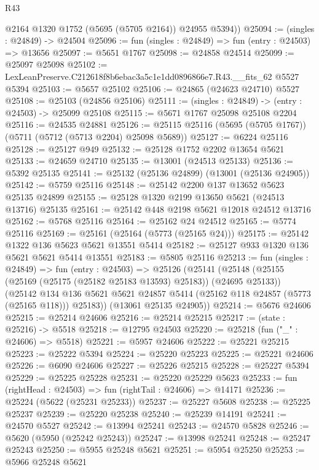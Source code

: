 \begin{lexlean}{R43}
\begin{coremodule}
        @2164
        @1320
        @1752
        (@5695 (@5705 @2164))
        @24955
        @5394))
@25094 := (singles : @24849) -> @24504
@25096 := fun (singles : @24849) => fun (entry : @24503) => @13656
@25097 := @5651 @1767
@25098 := @24858 @24514
@25099 := @25097 @25098
@25102 := LexLeanPreserve.C212618f8b6ebac3a5c1e1dd0896866e7.R43.__fits_62 @5527 @5394
@25103 := @5657 @25102
@25106 := @24865 (@24623 @24710) @5527
@25108 := @25103 (@24856 @25106)
@25111 := (singles : @24849) -> (entry : @24503) -> @25099 @25108
@25115 := @5671 @1767 @25098 @25108 @2204
@25116 := @24535 @24881
@25126 := @25115 @25116 (@5695 (@5705 @1767)) (@5711 (@5712 (@5713 @2204) @25098 @5689))
@25127 := @6224 @25116
@25128 := @25127 @949
@25132 := @25128 @1752 @2202 @13654 @5621
@25133 := @24659 @24710
@25135 := @13001 (@24513 @25133)
@25136 := @5392 @25135
@25141 := @25132 (@25136 @24899) (@13001 (@25136 @24905))
@25142 := @5759 @25116
@25148 := @25142 @2200 @137 @13652 @5623 @25135 @24899
@25155 := @25128 @1320 @2199 @13650 @5621 (@24513 @13716) @25135
@25161 := @25142 @448 @2198 @5621 @12018 @24512 @13716
@25162 := @5768 @25116
@25164 := @25162 @24 @24512
@25165 := @5774 @25116
@25169 := @25161 (@25164 (@5773 (@25165 @24)))
@25175 := @25142 @1322 @136 @5623 @5621 @13551 @5414
@25182 := @25127 @933 @1320 @136 @5621 @5621 @5414 @13551
@25183 := @5805 @25116
@25213 := fun (singles : @24849) =>
  fun (entry : @24503) =>
  @25126
    (@25141
      (@25148
        (@25155 (@25169 (@25175 (@25182 @25183 @13593) @25183)) (@24695 @25133))
        (@25142
          @134
          @136
          @5621
          @5621
          @24857
          @5414
          (@25162 @118 @24857 (@5773 (@25165 @118)))
          @25183))
      (@13061 @25135 @24905))
@25214 := @5676 @24606
@25215 := @25214 @24606
@25216 := @25214 @25215
@25217 := (state : @25216) -> @5518
@25218 := @12795 @24503
@25220 := @25218 (fun ("_" : @24606) => @5518)
@25221 := @5957 @24606
@25222 := @25221 @25215
@25223 := @25222 @5394
@25224 := @25220 @25223
@25225 := @25221 @24606
@25226 := @6090 @24606
@25227 := @25226 @25215
@25228 := @25227 @5394
@25229 := @25225 @25228
@25231 := @25220 @25229 @5623
@25233 := fun (rightHead : @24503) => fun (rightTail : @24606) => @14171
@25236 := @25224 (@5622 (@25231 @25233))
@25237 := @25227 @5608
@25238 := @25225 @25237
@25239 := @25220 @25238
@25240 := @25239 @14191
@25241 := @24570 @5527
@25242 := @13994 @25241
@25243 := @24570 @5828
@25246 := @5620 (@5950 (@25242 @25243))
@25247 := @13998 @25241
@25248 := @25247 @25243
@25250 := @5955 @25248 @5621
@25251 := @5954 @25250
@25253 := @5966 @25248 @5621

\end{coremodule}
\end{lexlean}
